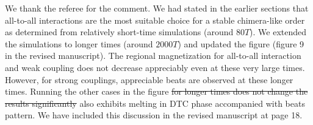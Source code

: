 \documentclass[aps,prb,reprint,showpacs,floatfix,superscriptaddress, onecolumn, nofootinbib, 10pt]{revtex4-2}
\newcommand{\response}[1]{{\color{black}#1}} %
\newcommand{\red}[1]{{\color{red}#1}} %
\begin{document}
\begin{enumerate}
\begin{enumerate}
\begin{enumerate}
			\response{
			We thank the referee for the comment. We had stated in the earlier sections  that all-to-all interactions are the most suitable choice  for a stable chimera-like order as determined from relatively short-time simulations (around $80T$). We extended the simulations to longer times (around $2000T$) and updated the figure (figure 9 in the revised manuscript). The regional magnetization for all-to-all interaction and weak coupling  does not decrease appreciably even at these very large times. However, for strong couplings, appreciable beats are observed at these longer times. Running the other cases in the figure \sout{for longer times does not change the results significantly} \red{also exhibits melting in DTC phase accompanied with beats pattern}. We have included this discussion in the revised manuscript at page 18. 
			
}
\end{enumerate}
\end{enumerate}
\end{enumerate}
\end{document}

